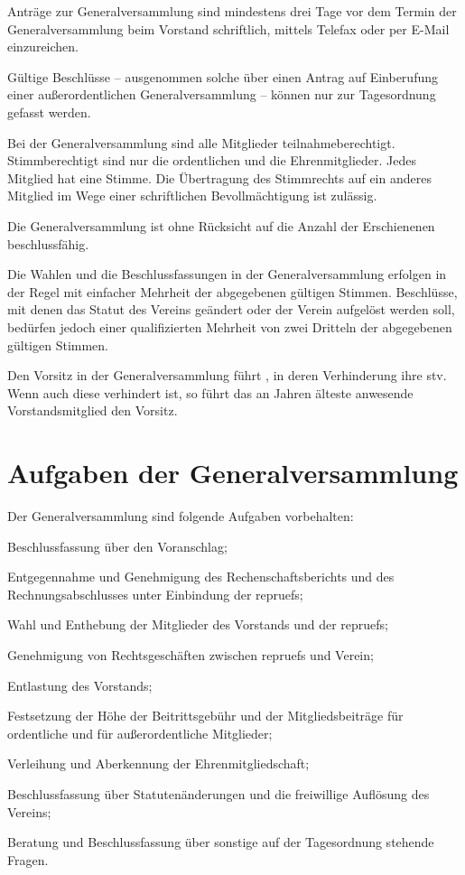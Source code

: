 \documentclass{article}
\begin{document}
\begin{absatz}
    \item Anträge zur Generalversammlung sind mindestens drei Tage vor dem Termin der Generalversammlung beim Vorstand schriftlich, mittels Telefax oder per E-Mail einzureichen.
    \item Gültige Beschlüsse – ausgenommen solche über einen Antrag auf Einberufung einer außerordentlichen Generalversammlung – können nur zur Tagesordnung gefasst werden.
    \item Bei der Generalversammlung sind alle Mitglieder teilnahmeberechtigt. Stimmberechtigt sind nur die ordentlichen und die Ehrenmitglieder. Jedes Mitglied hat eine Stimme. Die Übertragung des Stimmrechts auf ein anderes Mitglied im Wege einer schriftlichen Bevollmächtigung ist zulässig.
    \item Die Generalversammlung ist ohne Rücksicht auf die Anzahl der Erschienenen beschlussfähig.
    \item Die Wahlen und die Beschlussfassungen in der Generalversammlung erfolgen in der Regel mit einfacher Mehrheit der abgegebenen gültigen Stimmen. Beschlüsse, mit denen das Statut des Vereins geändert oder der Verein aufgelöst werden soll, bedürfen jedoch einer qualifizierten Mehrheit von zwei Dritteln der abgegebenen gültigen Stimmen.
    \item Den Vorsitz in der Generalversammlung führt , in deren Verhinderung ihre \gls{stv}. Wenn auch diese verhindert ist, so führt das an Jahren älteste anwesende Vorstandsmitglied den Vorsitz.
\end{absatz}



\section{Aufgaben der Generalversammlung}\label{generalversammlung-aufgaben}
Der Generalversammlung sind folgende Aufgaben vorbehalten:
\begin{littera}
    \item Beschlussfassung über den Voranschlag;
    \item Entgegennahme und Genehmigung des Rechenschaftsberichts und des Rechnungsabschlusses unter Einbindung der \glspl{repruef};
    \item Wahl und Enthebung der Mitglieder des Vorstands und der \glspl{repruef};
    \item Genehmigung von Rechtsgeschäften zwischen \glspl{repruef} und Verein;
    \item Entlastung des Vorstands;
    \item Festsetzung der Höhe der Beitrittsgebühr und der Mitgliedsbeiträge für ordentliche und für außerordentliche Mitglieder;
    \item Verleihung und Aberkennung der Ehrenmitgliedschaft;
    \item Beschlussfassung über Statutenänderungen und die freiwillige Auflösung des Vereins;
    \item Beratung und Beschlussfassung über sonstige auf der Tagesordnung stehende Fragen.
\end{littera}
\end{document}
